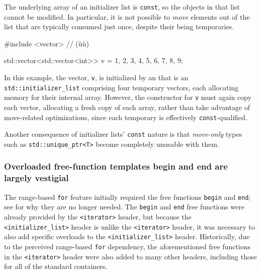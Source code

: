 The underlying array of an initializer list is \lstinline!const!, so the
objects in that list cannot be modified. In particular, it is not
possible to \emph{move} elements out of the list that are typically
consumed just once, despite their being temporaries.

\begin{emcppslisting}
#include <vector>   // (ù{}ù)

std::vector<std::vector<int>> v = {{1, 2, 3},
                                   {4, 5, 6},
                                   {7, 8},
                                   {9}};
\end{emcppslisting}
    

\noindent In this example, the vector, \lstinline!v!, is initialized by an
 that is an \lstinline!std::initializer_list! comprising four
temporary vectors, each allocating memory for their internal array.
However, the constructor for \lstinline!v! must again copy each vector,
allocating a fresh copy of each array, rather than take advantage of
move-related optimizations, since each temporary is effectively
\lstinline!const!-qualified.

Another consequence of initializer lists' \lstinline!const! nature is that
\emph{move-only} types such as \lstinline!std::unique_ptr<T>! become
completely unusable with them.

\subsubsection[Overloaded free-function templates \lstinline!begin! and \lstinline!end! are largely vestigial]{Overloaded free-function templates {\SubsubsecCode begin} and {\SubsubsecCode end} are largely vestigial}\label{overloaded-free-function-templates-begin-and-end-are-largely-vestigial}

The range-based \lstinline!for! feature initially required the free
functions \lstinline!begin! and \lstinline!end!; see  for why
they are no longer needed. The \lstinline!begin! and \lstinline!end! free
functions were already provided by the \lstinline!<iterator>! header, but
because the \lstinline!<initializer_list>! header is 
unlike the \lstinline!<iterator>! header, it was necessary to also add
specific overloads to the \lstinline!<initializer_list>! header.
Historically, due to the perceived range-based \lstinline!for! dependency,
the aforementioned free functions in the \lstinline!<iterator>! header were
also added to many other headers, including those for all of the
standard containers.


